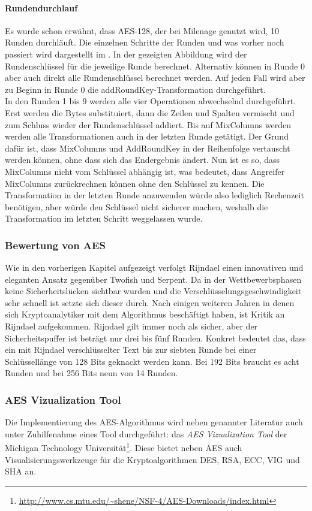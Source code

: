   \paragraph{Rundendurchlauf}
  Es wurde schon erwähnt, dass AES-128, der bei Milenage genutzt wird, 10 Runden durchläuft. Die einzelnen Schritte
  der Runden und was vorher noch passiert wird dargestellt im . In der gezeigten Abbildung
  wird der Rundenschlüssel für die jeweilige Runde berechnet. Alternativ können in Runde 0 aber auch direkt alle
  Rundenschlüssel berechnet werden. Auf jeden Fall wird aber zu Beginn in Runde 0 die addRoundKey-Transformation
  durchgeführt. \\
  In den Runden 1 bis 9 werden alle vier Operationen abwechselnd durchgeführt. Erst werden die Bytes substituiert, dann
  die Zeilen und Spalten vermischt und zum Schluss wieder der Rundenschlüssel addiert. Bis auf MixColumns werden werden
  alle Transformationen auch in der letzten Runde getätigt. Der Grund dafür ist, dass MixColumns und AddRoundKey in
  der Reihenfolge vertauscht werden können, ohne dass sich das Endergebnis ändert. Nun ist es so, dass MixColumns
  nicht vom Schlüssel abhängig ist, was bedeutet, dass Angreifer MixColumns zurückrechnen können ohne den Schlüssel
  zu kennen. Die Transformation in der letzten Runde anzuwenden würde also lediglich Rechenzeit benötigen, aber würde
  den Schlüssel nicht sicherer machen, weshalb die Transformation im letzten Schritt weggelassen wurde. \cite{schmeh07}
  
  \subsubsection{Bewertung von AES}
  Wie in den vorherigen Kapitel aufgezeigt verfolgt Rijndael einen innovativen und eleganten Ansatz gegenüber Twofish und
  Serpent. Da in der Wettbewerbsphasen keine Sicherheitslücken sichtbar wurden und die Verschlüsselungsgeschwindigkeit
  sehr schnell ist setzte sich dieser durch. Nach einigen weiteren Jahren in denen sich Kryptoanalytiker mit dem Algorithmus
  beschäftigt haben, ist Kritik an Rijndael aufgekommen. Rijndael gilt immer noch als sicher, aber der Sicherheitspuffer ist beträgt
  nur drei bis fünf Runden. Konkret bedeutet das, dass ein mit Rijndael verschlüsselter Text bis zur siebten Runde bei einer
  Schlüssellänge von 128 Bits geknackt werden kann. Bei 192 Bits braucht es acht Runden und bei 256 Bits neun von 14 Runden.
  
   \subsubsection{AES Vizualization Tool}
   \label{subsubsec:aesviz}
   Die Implementierung des AES-Algorithmus wird neben genannter Literatur auch unter
   Zuhilfenahme eines Tool durchgeführt: das \textit{AES Vizualization Tool} der Michigan
   Technology Universität\footnote{\url{http://www.cs.mtu.edu/~shene/NSF-4/AES-Downloads/index.html}}.
   Diese bietet neben AES auch Visualisierungswerkzeuge für die Kryptoalgorithmen DES, RSA, ECC, VIG
   und SHA an.

